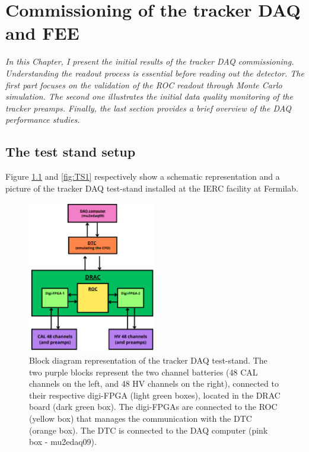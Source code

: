 \chapter{Commissioning of the tracker DAQ and FEE}\label{commissioning}
\textit{In this Chapter, I present the initial results of the tracker DAQ commissioning. 
Understanding the readout process is essential before reading out the detector. 
The first part focuses on the validation of the ROC readout through Monte Carlo simulation. 
The second one illustrates the initial data quality monitoring of the tracker preamps. 
Finally, the last section provides a brief overview of the DAQ performance studies.
}

  \section{The test stand setup}\label{des}
  Figure \ref{fig:blockdiagram} and \ref{fig:TS1} respectively show a 
  schematic representation and a picture of the tracker DAQ test-stand 
  installed at the IERC facility at Fermilab.
  \begin{figure}[!h]
    \centering
    \includegraphics[width =0.5\textwidth]{figures/png/Screenshot_20240712_102528.png}
    \caption[Block diagram representation of the tracker DAQ test-stand]{Block diagram representation of the tracker DAQ test-stand. The two purple 
    blocks represent the two channel batteries (48 CAL channels on the left, 
    and 48 HV channels on the right), connected to their respective digi-FPGA 
    (light green boxes), located in the DRAC board (dark green box). The 
    digi-FPGAs are connected to the ROC (yellow box) that manages the communication with the
    DTC (orange box). The DTC is connected to the DAQ 
    computer (pink box - mu2edaq09).}
    \label{fig:blockdiagram}
    \end{figure}







